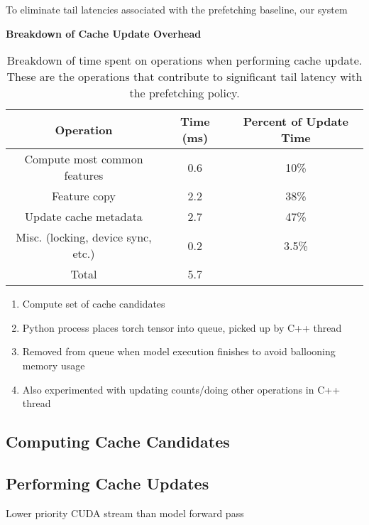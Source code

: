  
To eliminate tail latencies associated with the prefetching baseline, our system 
\begin{table}[h]
    \begin{center}
        \textbf{Breakdown of Cache Update Overhead}
        \begin{tabular}{|c c c|} 
        \hline
        \textbf{Operation} & \textbf{Time (ms)} & \textbf{Percent of Update Time} \\ [0.5ex] 
        \hline\hline
        Compute most common features & 0.6 & 10\% \\
        \hline
        Feature copy & 2.2 & 38\% \\
        \hline
        Update cache metadata & 2.7 & 47\%  \\
        \hline
        Misc. (locking, device sync, etc.) & 0.2 & 3.5\% \\
        \hline
        Total & 5.7 & \\
        \hline
        \end{tabular}
    \end{center}
    \caption{Breakdown of time spent on operations when performing cache update.
    These are the operations that contribute to significant tail latency with the prefetching policy.
    }
    \label{Update latencies}
\end{table}

\begin{enumerate}
    \item Compute set of cache candidates
    \item Python process places torch tensor into queue, picked up by C++ thread
    \item Removed from queue when model execution finishes to avoid ballooning memory usage
    \item Also experimented with updating counts/doing other operations in C++ thread
\end{enumerate}

\subsection{Computing Cache Candidates}

\subsection{Performing Cache Updates}
Lower priority CUDA stream than model forward pass

